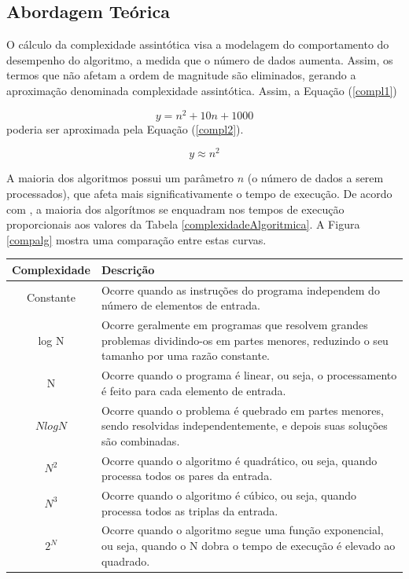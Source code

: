 {	\subsection{Abordagem Teórica}

	 O cálculo da complexidade assintótica visa a modelagem do comportamento do desempenho do algoritmo, a medida que o número de dados aumenta. Assim, os termos que não afetam a ordem de magnitude são eliminados, gerando a aproximação denominada complexidade assintótica. Assim, a  Equação (\ref{compl1})

	\begin{equation}
		y = n^{2} +10 n + 1000
	\label{compl1}
	\end{equation}
 poderia ser aproximada pela  Equação (\ref{compl2}).


	\begin{equation}
		y \approx  n^{2} 
	\label{compl2}
	\end{equation}

	A maioria dos algoritmos possui um parâmetro $n$ (o número de dados a serem processados), que afeta mais significativamente o tempo de execução. De acordo com \cite{complexidade2}, a maioria dos algorítmos se enquadram nos tempos de execução proporcionais aos valores da Tabela \ref{complexidadeAlgoritmica}. A Figura \ref{compalg} mostra uma comparação entre estas curvas. 

\begin{table}[ht]
	\centering	
	\begin{tabularx}{0.9\textwidth}{cX}
		\toprule
		\textbf{Complexidade} & \textbf{Descrição}  \\
		\midrule
		Constante &  Ocorre quando as instruções do programa independem do número de elementos de entrada.\\
		log N & Ocorre geralmente em programas que resolvem grandes problemas dividindo-os em partes menores, reduzindo o seu tamanho por uma razão constante.  \\
		N & Ocorre quando o programa é linear, ou seja, o  processamento é feito para cada elemento de entrada. \\
		$ N log N$ & Ocorre quando o problema é quebrado em partes menores, sendo resolvidas independentemente, e depois suas soluções são combinadas. \\
		$ N^{2}$ & Ocorre quando o algoritmo é quadrático, ou seja, quando processa todos os pares da entrada. \\
		$ N^{3}$ & Ocorre quando o algoritmo é cúbico, ou seja, quando processa todos as triplas da entrada. \\
		$ 2^{N}$ & Ocorre quando o algoritmo segue uma função exponencial, ou seja, quando o N dobra o tempo de execução é elevado ao quadrado. \\
	

\end{tabularx}
\end{table}}
